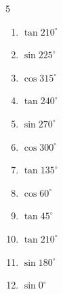 \begin{multicols}{5}
\begin{enumerate}

  \item $\displaystyle \tan{210^\circ}$


  \item $\displaystyle \sin{225^\circ}$


  \item $\displaystyle \cos{315^\circ}$


  \item $\displaystyle \tan{240^\circ}$


  \item $\displaystyle \sin{270^\circ}$

        \phantom{$\displaystyle =-1$}

  \item $\displaystyle \cos{300^\circ}$


  \item $\displaystyle \tan{135^\circ}$

        \phantom{$\displaystyle =-1$}

\columnbreak %

  \item $\displaystyle \cos{60^\circ}$


  \item $\displaystyle \tan{45^\circ}$

        \phantom{$\displaystyle =1$}

  \item $\displaystyle \tan{210^\circ}$


  \item $\displaystyle \sin{180^\circ}$

        \phantom{$\displaystyle =0$}

  \item $\displaystyle \sin{0^\circ}$

        \phantom{$\displaystyle =0$}


\end{enumerate}
\end{multicols}
